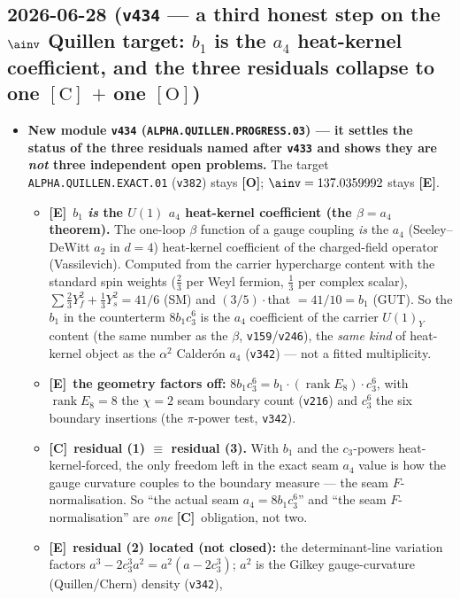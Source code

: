 \documentclass[11pt]{article}
\providecommand{\mE}{\textbf{[E]}}\providecommand{\mC}{\textbf{[C]}}
\providecommand{\mO}{\textbf{[O]}}\providecommand{\mX}{\textbf{[X]}}
\providecommand{\vref}[1]{\texttt{#1}}
\providecommand{\cthree}{c_3}\providecommand{\phiz}{\varphi_0^{\mathrm{ret}}}
\begin{document}
\subsection*{2026-06-28 (\texttt{v434} --- a third honest step on the $\ainv$ Quillen target: $b_1$ is the $a_4$ heat-kernel coefficient, and the three residuals collapse to one $\mathrm{[C]}$ $+$ one $\mathrm{[O]}$)}
\begin{itemize}
\item \textbf{New module \texttt{v434} (\texttt{ALPHA.QUILLEN.PROGRESS.03}) --- it settles the status of the
three residuals named after \vref{v433} and shows they are \emph{not} three independent open problems.} The
target \texttt{ALPHA.QUILLEN.EXACT.01} (\vref{v382}) stays \mO; $\ainv=137.0359992$ stays \mE.
\begin{itemize}
\item \mE\ \textbf{$b_1$ \emph{is} the $U(1)$ $a_4$ heat-kernel coefficient (the $\beta=a_4$ theorem).} The
one-loop $\beta$ function of a gauge coupling \emph{is} the $a_4$ (Seeley--DeWitt $a_2$ in $d{=}4$) heat-kernel
coefficient of the charged-field operator (Vassilevich). Computed from the carrier hypercharge content with the
standard spin weights ($\tfrac23$ per Weyl fermion, $\tfrac13$ per complex scalar),
$\sum\tfrac23 Y_f^2+\tfrac13 Y_s^2 = 41/6$ (SM) and $(3/5)\cdot{}$that $=41/10=b_1$ (GUT). So the $b_1$ in the
counterterm $8b_1\cthree^6$ is the $a_4$ coefficient of the carrier $U(1)_Y$ content (the same number as the
$\beta$, \vref{v159}/\vref{v246}), the \emph{same kind} of heat-kernel object as the $\alpha^2$ Calder\'on $a_4$
(\vref{v342}) --- not a fitted multiplicity.
\item \mE\ \textbf{the geometry factors off:} $8b_1\cthree^6=b_1\cdot(\operatorname{rank}E_8)\cdot\cthree^6$, with
$\operatorname{rank}E_8=8$ the $\chi{=}2$ seam boundary count (\vref{v216}) and $\cthree^6$ the six boundary
insertions (the $\pi$-power test, \vref{v342}).
\item \mC\ \textbf{residual (1) $\equiv$ residual (3).} With $b_1$ and the $\cthree$-powers heat-kernel-forced,
the only freedom left in the exact seam $a_4$ value is how the gauge curvature couples to the boundary measure ---
the seam $F$-normalisation. So ``the actual seam $a_4=8b_1\cthree^6$'' and ``the seam $F$-normalisation'' are
\emph{one} \mC\ obligation, not two.
\item \mE\ \textbf{residual (2) located (not closed):} the determinant-line variation factors
$a^3-2\cthree^3 a^2 = a^2(a-2\cthree^3)$; $a^2$ is the Gilkey gauge-curvature (Quillen/Chern) density (\vref{v342}),

\end{itemize}
\end{itemize}
\end{document}
